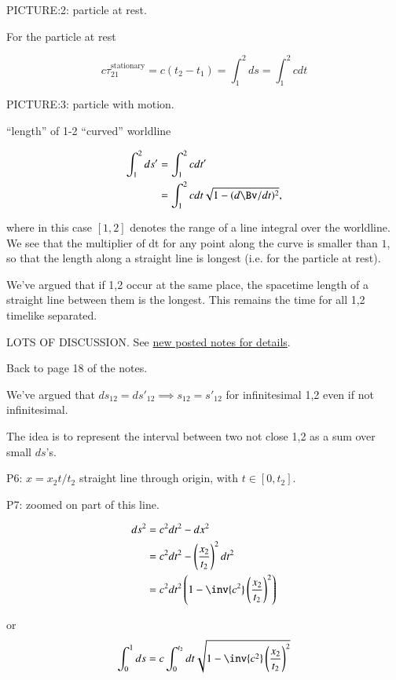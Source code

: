 PICTURE:2: particle at rest.

For the particle at rest 

\begin{equation}\label{eqn:relativisticElectrodynamicsL5:30}
c \tau_{21}^\text{stationary} = c ( t_2 - t_1 ) = \int_1^2 ds = \int_1^2 c dt
\end{equation}

PICTURE:3: particle with motion.

``length'' of 1-2 ``curved'' worldline

\begin{align*}
\int_1^2 ds' 
&= \int_1^2 c dt' \\
&= \int_1^2 c dt \sqrt{ 1 - (d\Bv/dt)^2 },
\end{align*}

where in this case $[1,2]$ denotes the range of a line integral over the worldline.  We see that the multiplier of dt for any point along the curve is smaller than $1$, so that the length along a straight line is longest (i.e. for the particle at rest).

We've argued that if 1,2 occur at the same place, the spacetime length of a straight line between them is the longest.  This remains the time  for all 1,2 timelike separated.

LOTS OF DISCUSSION.  See \href{http://www.physics.utoronto.ca/~poppitz/e-poppitz/PHY450_files/pp.24.1-24.4.pdf}{new posted notes for details}.

Back to page 18 of the notes.

We've argued that $ds_{12} = {ds'}_{12} \implies s_{12} = {s'}_{12}$ for infinitesimal 1,2 even if not infinitesimal.

The idea is to represent the interval between two not close 1,2 as a sum over small $ds$'s.

P6: $x = x_2 t /t_2$ straight line through origin, with $t \in [0, t_2]$.

P7: zoomed on part of this line.

\begin{align*}
ds^2 
&= c^2 dt^2 - dx^2 \\
&= c^2 dt^2 - \left(\frac{x_2}{t_2}\right)^2 dt^2 \\
&= c^2 dt^2 \left( 1 - \inv{c^2} \left(\frac{x_2}{t_2}\right)^2 \right) \\
\end{align*}

or
\begin{equation}\label{eqn:relativisticElectrodynamicsL5:40}
\int_0^1 ds 
= c \int_0^{t_2} dt \sqrt{ 1 - \inv{c^2} \left(\frac{x_2}{t_2}\right)^2 } 
\end{equation}

